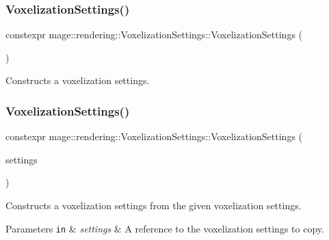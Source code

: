 \subsubsection{\texorpdfstring{Voxelization\+Settings()}{VoxelizationSettings()}\hspace{0.1cm}{\footnotesize\ttfamily [1/3]}}
{\footnotesize\ttfamily constexpr mage\+::rendering\+::\+Voxelization\+Settings\+::\+Voxelization\+Settings (\begin{DoxyParamCaption}{ }\end{DoxyParamCaption})}

Constructs a voxelization settings. \mbox{\label{classmage_1_1rendering_1_1_voxelization_settings_a62f8755e86da892cd22467309fecfe95}} 
\subsubsection{\texorpdfstring{Voxelization\+Settings()}{VoxelizationSettings()}\hspace{0.1cm}{\footnotesize\ttfamily [2/3]}}
{\footnotesize\ttfamily constexpr mage\+::rendering\+::\+Voxelization\+Settings\+::\+Voxelization\+Settings (\begin{DoxyParamCaption}\item[{const \mbox{\hyperlink{classmage_1_1rendering_1_1_voxelization_settings}{Voxelization\+Settings}} \&}]{settings }\end{DoxyParamCaption})\hspace{0.3cm}{\ttfamily [default]}}

Constructs a voxelization settings from the given voxelization settings.


\begin{DoxyParams}[1]{Parameters}
\mbox{\tt in}  & {\em settings} & A reference to the voxelization settings to copy. \\
\hline
\end{DoxyParams}
\mbox{\label{classmage_1_1rendering_1_1_voxelization_settings_af706582ce61228cd994aa72c537aa020}} 
